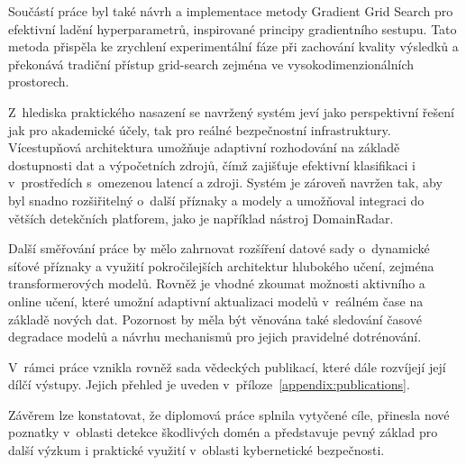 Součástí práce byl také návrh a implementace metody Gradient Grid Search pro efektivní ladění hyperparametrů, inspirované principy gradientního sestupu. Tato metoda přispěla ke zrychlení experimentální fáze při zachování kvality výsledků a překonává tradiční přístup grid-search zejména ve vysokodimenzionálních prostorech.

Z~hlediska praktického nasazení se navržený systém jeví jako perspektivní řešení jak pro akademické účely, tak pro reálné bezpečnostní infrastruktury. Vícestupňová architektura umožňuje adaptivní rozhodování na základě dostupnosti dat a výpočetních zdrojů, čímž zajišťuje efektivní klasifikaci i v~prostředích s~omezenou latencí a zdroji. Systém je zároveň navržen tak, aby byl snadno rozšiřitelný o~další příznaky a modely a umožňoval integraci do větších detekčních platforem, jako je například nástroj DomainRadar.

Další směřování práce by mělo zahrnovat rozšíření datové sady o~dynamické síťové příznaky a využití pokročilejších architektur hlubokého učení, zejména transformerových modelů. Rovněž je vhodné zkoumat možnosti aktivního a online učení, které umožní adaptivní aktualizaci modelů v~reálném čase na základě nových dat. Pozornost by měla být věnována také sledování časové degradace modelů a návrhu mechanismů pro jejich pravidelné dotrénování.

V~rámci práce vznikla rovněž sada vědeckých publikací, které dále rozvíjejí její dílčí výstupy. Jejich přehled je uveden v~příloze~\ref{appendix:publications}.

Závěrem lze konstatovat, že diplomová práce splnila vytyčené cíle, přinesla nové poznatky v~oblasti detekce škodlivých domén a představuje pevný základ pro další výzkum i praktické využití v~oblasti kybernetické bezpečnosti.




